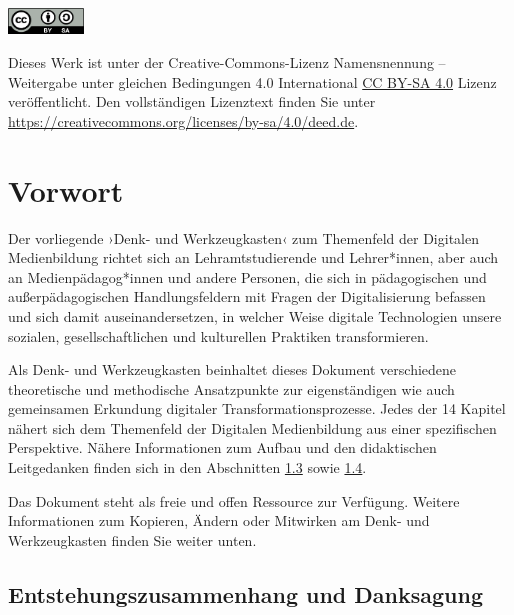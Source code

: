 \documentclass[
  a4paper,
]{book}
\begin{document}
\includegraphics[width=0.15\textwidth]{"Figures/by-sa.png"}\par\vspace{1cm}


\noindent Dieses Werk ist unter der Creative-Commons-Lizenz Namensnennung – Weitergabe unter gleichen Bedingungen 4.0 International \href{(https://creativecommons.org/licenses/by-sa/4.0/}{CC BY-SA 4.0} Lizenz veröffentlicht. Den vollständigen Lizenztext finden Sie unter \href{https://creativecommons.org/licenses/by-sa/4.0/deed.de}{https://creativecommons.org/licenses/by-sa/4.0/deed.de}.\\ %


\newpage
{}

{
\setcounter{tocdepth}{1}
\tableofcontents
}
\chapter*{Vorwort}\label{vorwort}

Der vorliegende ›Denk- und Werkzeugkasten‹ zum Themenfeld der Digitalen Medienbildung richtet sich an Lehramtstudierende und Lehrer*innen, aber auch an Medienpädagog*innen und andere Personen, die sich in pädagogischen und außerpädagogischen Handlungsfeldern mit Fragen der Digitalisierung befassen und sich damit auseinandersetzen, in welcher Weise digitale Technologien unsere sozialen, gesellschaftlichen und kulturellen Praktiken transformieren.

Als Denk- und Werkzeugkasten beinhaltet dieses Dokument verschiedene theoretische und methodische Ansatzpunkte zur eigenständigen wie auch gemeinsamen Erkundung digitaler Transformationsprozesse. Jedes der 14 Kapitel nähert sich dem Themenfeld der Digitalen Medienbildung aus einer spezifischen Perspektive. Nähere Informationen zum Aufbau und den didaktischen Leitgedanken finden sich in den Abschnitten \hyperref[keine-gebrauchsanweisung]{1.3} sowie \hyperref[inhalte-der-materialsammlung]{1.4}.

Das Dokument steht als freie und offen Ressource zur Verfügung. Weitere Informationen zum Kopieren, Ändern oder Mitwirken am Denk- und Werkzeugkasten finden Sie weiter unten.

\section{Entstehungszusammenhang und Danksagung}\label{entstehungszusammenhang-und-danksagung}
\end{document}
